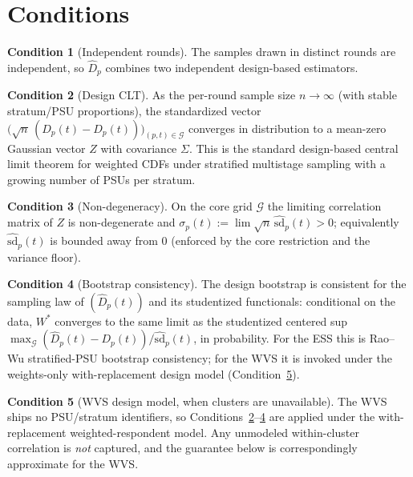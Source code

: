 \documentclass[12pt]{article}
\theoremstyle{definition}
\newtheorem{condition}{Condition}
\theoremstyle{remark}
\newcommand{\Dhat}{\widehat D}
\newcommand{\sdhat}{\widehat{\mathrm{sd}}}
\begin{document}
\section*{Conditions}

\begin{condition}[Independent rounds]\label{c:indep}
The samples drawn in distinct rounds are independent, so $\Dhat_p$ combines two independent
design-based estimators.
\end{condition}

\begin{condition}[Design CLT]\label{c:clt}
As the per-round sample size $n\to\infty$ (with stable stratum/PSU proportions), the
standardized vector $\big(\sqrt n\,(\Dhat_p(t)-D_p(t))\big)_{(p,t)\in\mathcal G}$ converges
in distribution to a mean-zero Gaussian vector $Z$ with covariance $\Sigma$. This is the
standard design-based central limit theorem for weighted CDFs under stratified multistage
sampling with a growing number of PSUs per stratum.
\end{condition}

\begin{condition}[Non-degeneracy]\label{c:nondeg}
On the core grid $\mathcal G$ the limiting correlation matrix of $Z$ is non-degenerate and
$\sigma_p(t):=\lim \sqrt n\,\sdhat_p(t)>0$; equivalently $\sdhat_p(t)$ is bounded away from
$0$ (enforced by the core restriction and the variance floor).
\end{condition}

\begin{condition}[Bootstrap consistency]\label{c:boot}
The design bootstrap is consistent for the sampling law of $(\Dhat_p(t))$ and its
studentized functionals: conditional on the data, $W^{*}$ converges to the same limit as the
studentized centered sup $\max_{\mathcal G}(\Dhat_p(t)-D_p(t))/\sdhat_p(t)$, in probability.
For the ESS this is Rao--Wu stratified-PSU bootstrap consistency; for the WVS it is invoked
under the weights-only with-replacement design model (Condition~\ref{c:wvs}).
\end{condition}

\begin{condition}[WVS design model, when clusters are unavailable]\label{c:wvs}
The WVS ships no PSU/stratum identifiers, so Conditions~\ref{c:clt}--\ref{c:boot} are applied
under the with-replacement weighted-respondent model. Any unmodeled within-cluster
correlation is \emph{not} captured, and the guarantee below is correspondingly approximate
for the WVS.
\end{condition}
\end{document}
